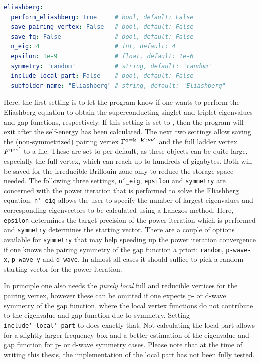 \documentclass[../../main.tex]{subfiles}
\begin{document}
\begin{minipage}{\textwidth}%
\begin{lstlisting}[language=yaml]
eliashberg:
  perform_eliashberg: True     # bool, default: False
  save_pairing_vertex: False   # bool, default: False
  save_fq: False               # bool, default: False
  n_eig: 4                     # int, default: 4
  epsilon: 1e-9                # float, default: 1e-6
  symmetry: "random"           # string, default: "random"
  include_local_part: False    # bool, default: False
  subfolder_name: "Eliashberg" # string, default: "Eliashberg"
\end{lstlisting}
\end{minipage}
Here, the first setting is to let the program know if one wants to perform the Eliashberg equation to obtain the superconducting singlet and triplet eigenvalues and gap functions, respectively. If this setting is set to , then the program will exit after the self-energy has been calculated. The next two settings allow saving the (non-symmetrized) pairing vertex $\tilde\Gamma^{\textbf{q}=\textbf{k}-\textbf{k}';\nu\nu'}$ and the full ladder vertex $F^{\text{q}\nu\nu'}$ to a file. These are set to  per default, as these objects can be quite large, especially the full vertex, which can reach up to hundreds of gigabytes. Both will be saved for the irreducible Brillouin zone only to reduce the storage space needed. The following three settings, \texttt{n\char`_eig}, \texttt{epsilon} and \texttt{symmetry} are concerned with the power iteration that is performed to solve the Eliashberg equation. \texttt{n\char`_eig} allows the user to specify the number of largest eigenvalues and corresponding eigenvectors to be calculated using a Lanczos method. Here, \texttt{epsilon} determines the target precision of the power iteration which is performed and \texttt{symmetry} determines the starting vector. There are a couple of options available for \texttt{symmetry} that may help speeding up the power iteration convergence if one knows the pairing symmetry of the gap function a priori: \texttt{random}, \texttt{p-wave-x}, \texttt{p-wave-y} and \texttt{d-wave}. In almost all cases it should suffice to pick a random starting vector for the power iteration. 

In principle one also needs the \textit{purely local} full and reducible vertices for the pairing vertex, however these can be omitted if one expects p- or d-wave symmetry of the gap function, where the local vertex functions do not contribute to the eigenvalue and gap function due to symmetry. Setting \texttt{include\char`_local\char`_part} to  does exactly that. Not calculating the local part allows for a slightly larger frequency box and a better estimation of the eigenvalue and gap function for p- or d-wave symmetry cases. Please note that at the time of writing this thesis, the implementation of the local part has not been fully tested.
\end{document}
